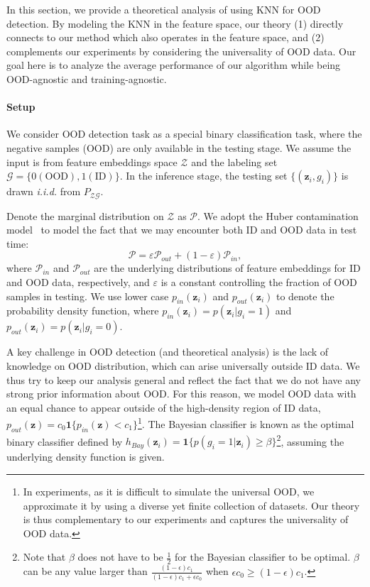 \documentclass[nohyperref]{article}
\newcommand{\calP}{\mathcal{P}}
\newcommand{\bz}{\mathbf{z}}
\theoremstyle{plain}
\theoremstyle{definition}
\theoremstyle{remark}
\begin{document}
In this section, we provide a theoretical analysis of using KNN for OOD detection. By modeling the KNN in the feature space, our theory (1) directly connects to our method which also operates in the feature space, and (2) complements our experiments by considering the universality of OOD data. Our goal here is to analyze the average performance of our algorithm while being OOD-agnostic and training-agnostic.

\paragraph{Setup}
We consider OOD detection task as a special binary classification task, where the negative samples (OOD) are only available in the testing stage. We assume the input is from feature embeddings space $\mathcal{Z}$ and the labeling set $\mathcal{G} = \{0 (\text{OOD}), 1 (\text{ID})\}$. In the inference stage, the testing set $\{(\bz_i, g_i)\}$ is drawn \textit{i.i.d.} from $P_{\mathcal{Z}\mathcal{G}}$. 

Denote the marginal distribution on $\mathcal{Z}$ as $\calP$. We adopt the Huber contamination model~\citep{huber1964} to model the fact that we may encounter both ID and OOD data in test time:
$$
\calP = \varepsilon \calP_{out} + (1 - \varepsilon )\calP_{in},
$$
where $\calP_{in}$ and $\calP_{out}$ are the underlying distributions of feature embeddings for ID and OOD data, respectively, and $\varepsilon$ is a constant controlling the fraction of OOD samples in testing. We use lower case $p_{in}(\bz_i)$ and $p_{out}(\bz_i)$ to denote the probability density function, where $p_{in}(\bz_i) = p(\bz_i| g_i=1)$ and $p_{out}(\bz_i) = p(\bz_i| g_i=0)$. 

A key challenge in OOD detection (and theoretical analysis) is the lack of knowledge on OOD distribution, which can arise universally outside ID data. We thus try to keep our analysis general and reflect the fact that we do not have any strong prior information about OOD. For this reason, we model OOD data with an equal chance to appear outside of the high-density region of ID data, $p_{out}(\bz) =c_0\mathbf{1}\{p_{in}(\bz) < c_1\}$\footnote{In experiments, as it is difficult to simulate the universal OOD, we approximate it by using a diverse yet finite collection of datasets. Our theory is thus complementary to our experiments and captures the universality of OOD data.}. The Bayesian classifier is known as the optimal binary classifier defined by $h_{Bay}(\bz_i) = \mathbf{1}\{p(g_i = 1|\bz_i) \ge \beta\}$\footnote{Note that $\beta$ does not have to be $\frac{1}{2}$ for the Bayesian classifier to be optimal. $\beta$ can be any value 
larger than $\frac{(1-\epsilon)c_1}{(1-\epsilon)c_1 + \epsilon c_0}$ when $\epsilon c_0 \ge (1-\epsilon)c_1$.}, assuming the underlying density function is given. 
\end{document}

